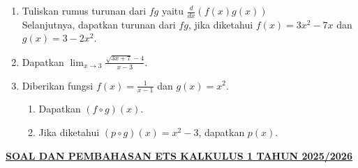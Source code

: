 \documentclass[10pt,openany,a4paper]{article}
\theoremstyle{definition}
\theoremstyle{definition}
\theoremstyle{plain}
\newenvironment{jawab}[2][tes]{
\textbf{Kata kunci materi:} #1.\\
\textbf{Penyelesaian:} #2
}{}
\begin{document}
\begin{enumerate}
\begin{jawab}[kemiringan garis, garis singgung lingkaran]
{\begin{enumerate}
                    \begin{align*}
                        m_{radius} = \frac{1 - 0}{-2 - 0} = \frac{1}{-2} = -\frac{1}{2}.
                    \end{align*}
                    \end{enumerate}
            }
                \end{jawab}
            \item Tuliskan rumus turunan dari $fg$ yaitu $\frac{d}{dx}(f(x)g(x))$\\
            Selanjutnya, dapatkan turunan dari $fg$, jika diketahui $f(x)=3x^2-7x$ dan $g(x)=3-2x^2$.
            \item Dapatkan $\displaystyle \lim_{x\to 3} \frac{\sqrt{3x+7}-4}{x-3}$.
            \item Diberikan fungsi $f(x)=\frac{1}{x-1}$ dan $g(x)=x^2$.
            \begin{enumerate}
                \item Dapatkan $(f\circ g)(x)$.
                \item Jika diketahui $(p\circ g)(x)=  x^2-3$, dapatkan $p(x)$.
            \end{enumerate}
        \end{enumerate}

\newpage
 \begin{center}
	{\underline{\textbf{\MakeUppercase{Soal dan Pembahasan ETS Kalkulus 1 Tahun 2025/2026}}}}
    \end{center}
\end{document}
